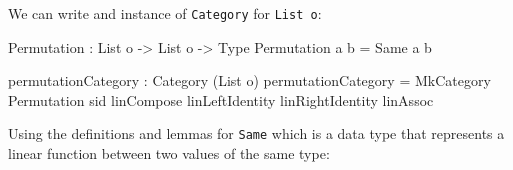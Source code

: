 \documentclass[
]{article}
\newenvironment{Shaded}{}{}
\newcommand{\DataTypeTok}[1]{\textcolor[rgb]{0.56,0.13,0.00}{#1}}
\newcommand{\NormalTok}[1]{#1}
\newcommand{\OperatorTok}[1]{\textcolor[rgb]{0.40,0.40,0.40}{#1}}
\newcommand{\OtherTok}[1]{\textcolor[rgb]{0.00,0.44,0.13}{#1}}
\begin{document}
We can write and instance of \texttt{Category} for \texttt{List\ o}:

\begin{Shaded}
\begin{Highlighting}[]
\DataTypeTok{Permutation} \OperatorTok{:} \DataTypeTok{List}\NormalTok{ o }\OtherTok{{-}\textgreater{}} \DataTypeTok{List}\NormalTok{ o }\OtherTok{{-}\textgreater{}} \DataTypeTok{Type}
\DataTypeTok{Permutation}\NormalTok{ a b }\OtherTok{=} \DataTypeTok{Same}\NormalTok{ a b}

\NormalTok{permutationCategory }\OperatorTok{:} \DataTypeTok{Category}\NormalTok{ (}\DataTypeTok{List}\NormalTok{ o)}
\NormalTok{permutationCategory }\OtherTok{=} \DataTypeTok{MkCategory}
  \DataTypeTok{Permutation}
\NormalTok{  sid}
\NormalTok{  linCompose}
\NormalTok{  linLeftIdentity}
\NormalTok{  linRightIdentity}
\NormalTok{  linAssoc}
\end{Highlighting}
\end{Shaded}

Using the definitions and lemmas for \texttt{Same} which is a data type
that represents a linear function between two values of the same type:
\end{document}
